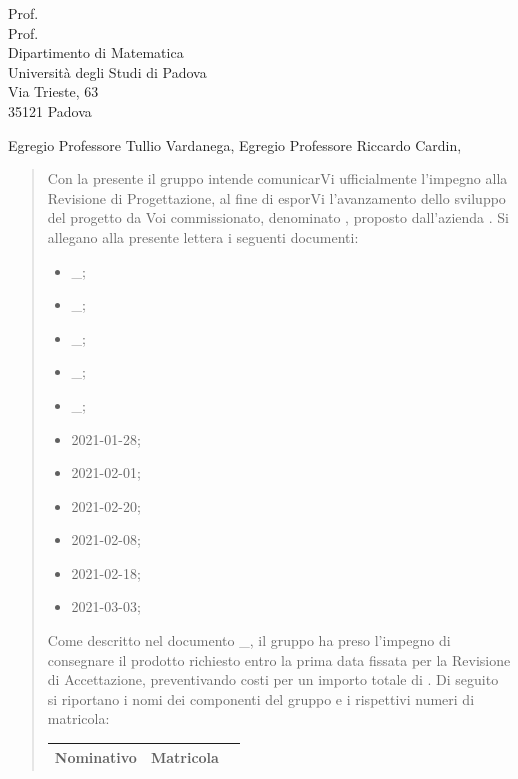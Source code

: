 \documentclass[a4paper,12pt]{letteracdp}
\date{11 gennaio 2021}
\begin{document}
\thispagestyle{empty}

\begin{letter}{
	Prof. \Tullio{} \\
	Prof. \Riccardo{} \\
	Dipartimento di Matematica \\
	Università degli Studi di Padova \\
	Via Trieste, 63 \\
	35121 Padova}
	
\opening{Egregio Professore Tullio Vardanega, \newline
Egregio Professore Riccardo Cardin,}

\begin{quotation}
	\noindent 
	Con la presente il gruppo \gruppo{} intende comunicarVi ufficialmente l'impegno alla Revisione di Progettazione, al fine di esporVi l'avanzamento dello sviluppo del progetto da Voi commissionato, denominato \progetto{}, proposto dall’azienda \proponente.\newline
	Si allegano alla presente lettera i seguenti documenti:
	\begin{itemize}
		\item \docAdR{}\_\versAdR;
		\item \docG{}\_\versGlo;
		\item \docNdP{}\_\versNdP;
		\item \docPdP{}\_\versPdP;
		\item \docPdQ{}\_\versPdQ;
		\item \docVI{}2021-01-28;
		\item \docVI{}2021-02-01;
		\item \docVI{}2021-02-20;
		\item \docVE{}2021-02-08;
		\item \docVE{}2021-02-18;
		\item \docVE{}2021-03-03;
\thispagestyle{empty}		
	\end{itemize}
Come descritto nel documento \docPdP{}\_\versPdP{}, il gruppo \gruppo{} ha preso l'impegno di consegnare il prodotto richiesto entro la prima data fissata per la Revisione di Accettazione, preventivando costi per un importo totale di \textbf{}. \newline
Di seguito si riportano i nomi dei componenti del gruppo e i rispettivi numeri di matricola:
	
	
\renewcommand{\arraystretch}{1}
	\begin{table}
		\begin{center}
			\setlength{\aboverulesep}{0pt}
			\setlength{\belowrulesep}{0pt}
			\setlength{\extrarowheight}{.75ex}
			\begin{tabular}{ c c c }
				\rowcolor{AzzurroGruppo!30} 
				\textbf{Nominativo} & \textbf{Matricola}\\
				\toprule
				

\end{tabular}
\end{center}
\end{table}
\end{quotation}
\end{letter}
\end{document}
